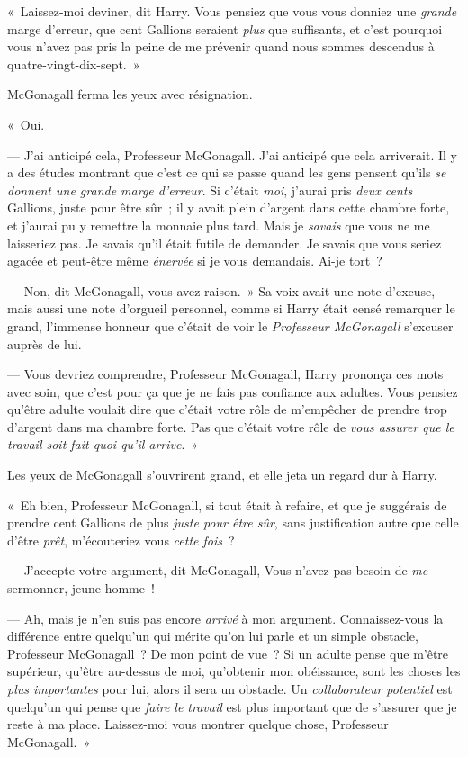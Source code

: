 «~Laissez-moi deviner, dit Harry. Vous pensiez que vous vous donniez une \emph{grande} marge d'erreur, que cent Gallions seraient \emph{plus} que suffisants, et c'est pourquoi vous n'avez pas pris la peine de me prévenir quand nous sommes descendus à quatre-vingt-dix-sept.~»

McGonagall ferma les yeux avec résignation.

«~Oui.

--- J'ai anticipé cela, Professeur McGonagall. J'ai anticipé que cela arriverait. Il y a des études montrant que c'est ce qui se passe quand les gens pensent qu'ils \emph{se donnent une grande marge d'erreur}. Si c'était \emph{moi}, j'aurai pris \emph{deux cents} Gallions, juste pour être sûr~; il y avait plein d'argent dans cette chambre forte, et j'aurai pu y remettre la monnaie plus tard. Mais je \emph{savais} que vous ne me laisseriez pas. Je savais qu'il était futile de demander. Je savais que vous seriez agacée et peut-être même \emph{énervée} si je vous demandais. Ai-je tort~?

--- Non, dit McGonagall, vous avez raison.~» Sa voix avait une note d'excuse, mais aussi une note d'orgueil personnel, comme si Harry était censé remarquer le grand, l'immense honneur que c'était de voir le \emph{Professeur McGonagall} s'excuser auprès de lui.

--- Vous devriez comprendre, Professeur McGonagall, Harry prononça ces mots avec soin, que c'est pour ça que je ne fais pas confiance aux adultes. Vous pensiez qu'être adulte voulait dire que c'était votre rôle de m'empêcher de prendre trop d'argent dans ma chambre forte. Pas que c'était votre rôle de \emph{vous assurer que le travail soit fait quoi qu'il arrive}.~»

Les yeux de McGonagall s'ouvrirent grand, et elle jeta un regard dur à Harry.

«~Eh bien, Professeur McGonagall, si tout était à refaire, et que je suggérais de prendre cent Gallions de plus \emph{juste pour être sûr}, sans justification autre que celle d'être \emph{prêt}, m'écouteriez vous \emph{cette fois}~?

--- J'accepte votre argument, dit McGonagall, Vous n'avez pas besoin de \emph{me} sermonner, jeune homme~!

--- Ah, mais je n'en suis pas encore \emph{arrivé} à mon argument. Connaissez-vous la différence entre quelqu'un qui mérite qu'on lui parle et un simple obstacle, Professeur McGonagall~? De mon point de vue~? Si un adulte pense que m'être supérieur, qu'être au-dessus de moi, qu'obtenir mon obéissance, sont les choses les \emph{plus importantes} pour lui, alors il sera un obstacle. Un \emph{collaborateur potentiel} est quelqu'un qui pense que \emph{faire le travail} est plus important que de s'assurer que je reste à ma place. Laissez-moi vous montrer quelque chose, Professeur McGonagall.~»

